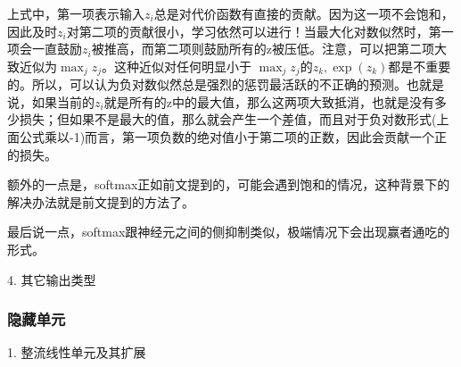 上式中，第一项表示输入$z_i$总是对代价函数有直接的贡献。因为这一项不会饱和，因此及时$z_i$对第二项的贡献很小，学习依然可以进行！当最大化对数似然时，第一项会一直鼓励$z_i$被推高，而第二项则鼓励所有的z被压低。注意，可以把第二项大致近似为$\max_j z_j$。这种近似对任何明显小于 $\max_j z_j$的$z_k, \exp(z_k)$都是不重要的。所以，可以认为负对数似然总是强烈的惩罚最活跃的不正确的预测。也就是说，如果当前的$z_i$就是所有的z中的最大值，那么这两项大致抵消，也就是没有多少损失；但如果不是最大的值，那么就会产生一个差值，而且对于负对数形式(上面公式乘以-1)而言，第一项负数的绝对值小于第二项的正数，因此会贡献一个正的损失。

额外的一点是，softmax正如前文提到的，可能会遇到饱和的情况，这种背景下的解决办法就是前文提到的方法了。

最后说一点，softmax跟神经元之间的侧抑制类似，极端情况下会出现赢者通吃的形式。

4. 其它输出类型

\subsubsection{隐藏单元}

1. 整流线性单元及其扩展

